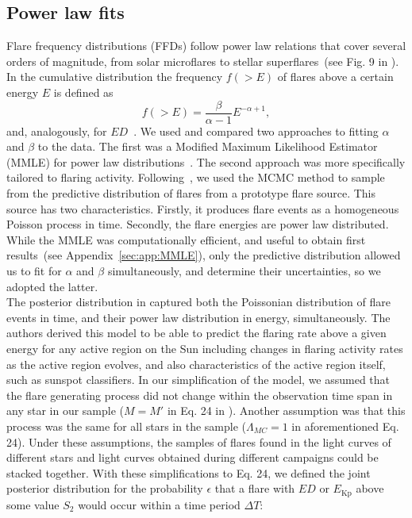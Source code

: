 \documentclass{aa}
\begin{document}
\subsection{Power law fits}
\label{powerlawfits}
Flare frequency distributions (FFDs) follow power law relations that cover several orders of magnitude, from solar microflares to stellar superflares~(see Fig. 9 in \citealt{shibayama2013}). In the cumulative distribution the frequency $f(>E)$ of flares above a certain energy $E$ is defined as
\begin{equation}
f(>E) = \dfrac{\beta}{\alpha - 1}E^{-\alpha + 1},
\label{eqn:cumdist}
\end{equation}
and, analogously, for $ED$~\citep{gershberg1972}. We used and compared two approaches to fitting $\alpha$ and $\beta$ to the data. The first was a Modified Maximum Likelihood Estimator (MMLE) for power law distributions~\citep{maschberger2009}. The second approach was more specifically tailored to flaring activity. Following~\citet{wheatland_flaresbayes_2004}, we used the MCMC method to sample from the predictive distribution of flares from a prototype flare source. This source has two characteristics. Firstly, it produces flare events as a homogeneous Poisson process in time. Secondly, the flare energies are power law distributed. While the MMLE was computationally efficient, and useful to obtain first results~(see Appendix~\ref{sec:app:MMLE}), only the predictive distribution allowed us to fit for $\alpha$ and $\beta$ simultaneously, and determine their uncertainties, so we adopted the latter.
\\
The posterior distribution in \citet{wheatland_flaresbayes_2004} captured both the Poissonian distribution of flare events in time, and their power law distribution in energy, simultaneously. The authors derived this model to be able to predict the flaring rate above a given energy for any active region on the Sun including changes in flaring activity rates as the active region evolves, and also characteristics of the active region itself, such as sunspot classifiers. In our simplification of the model, we assumed that the flare generating process did not change within the observation time span in any star in our sample ($M=M'$ in Eq. 24 in \citealt{wheatland_flaresbayes_2004}). Another assumption was that this process was the same for all stars in the sample ($\Lambda_{MC}=1$ in aforementioned Eq. 24). Under these assumptions, the samples of flares found in the light curves of different stars and light curves obtained during different campaigns could be stacked together. With these simplifications to Eq. 24, we defined the joint posterior distribution for the probability $\epsilon$ that a flare with $ED$ or $E_\mathrm{Kp}$ above some value $S_2$ would occur within a time period $\Delta T$:
\end{document}
